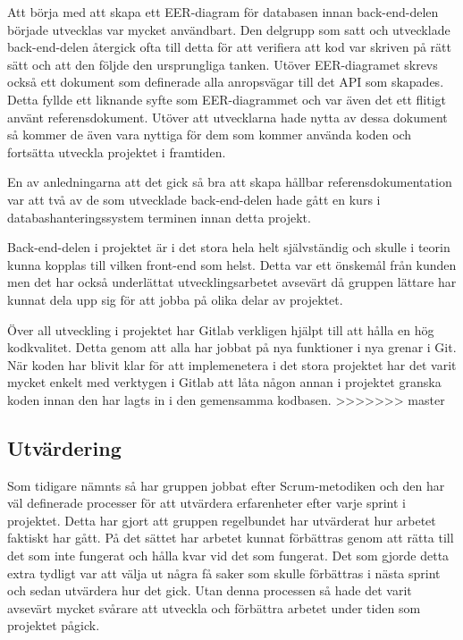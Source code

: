 Att börja med att skapa ett EER-diagram för databasen innan back-end-delen började utvecklas var mycket användbart. Den delgrupp som satt och utvecklade back-end-delen återgick ofta till detta för att verifiera att kod var skriven på rätt sätt och att den följde den ursprungliga tanken. Utöver EER-diagramet skrevs också ett dokument som definerade alla anropsvägar till det API som skapades. Detta fyllde ett liknande syfte som EER-diagrammet och var även det ett flitigt använt referensdokument. Utöver att utvecklarna hade nytta av dessa dokument så kommer de även vara nyttiga för dem som kommer använda koden och fortsätta utveckla projektet i framtiden.

En av anledningarna att det gick så bra att skapa hållbar referensdokumentation var att två av de som utvecklade back-end-delen hade gått en kurs i databashanteringssystem terminen innan detta projekt.

Back-end-delen i projektet är i det stora hela helt självständig och skulle i teorin kunna kopplas till vilken front-end som helst. Detta var ett önskemål från kunden men det har också underlättat utvecklingsarbetet avsevärt då gruppen lättare har kunnat dela upp sig för att jobba på olika delar av projektet.

Över all utveckling i projektet har Gitlab verkligen hjälpt till att hålla en hög kodkvalitet. Detta genom att alla har jobbat på nya funktioner i nya grenar i Git. När koden har blivit klar för att implemenetera i det stora projektet har det varit mycket enkelt med verktygen i Gitlab att låta någon annan i projektet granska koden innan den har lagts in i den gemensamma kodbasen.
>>>>>>> master

\subsection{Utvärdering}
Som tidigare nämnts så har gruppen jobbat efter Scrum-metodiken och den har väl definerade processer för att utvärdera erfarenheter efter varje sprint i projektet. Detta har gjort att gruppen regelbundet har utvärderat hur arbetet faktiskt har gått. På det sättet har arbetet kunnat förbättras genom att rätta till det som inte fungerat och hålla kvar vid det som fungerat. Det som gjorde detta extra tydligt var att välja ut några få saker som skulle förbättras i nästa sprint och sedan utvärdera hur det gick. Utan denna processen så hade det varit avsevärt mycket svårare att utveckla och förbättra arbetet under tiden som projektet pågick.


